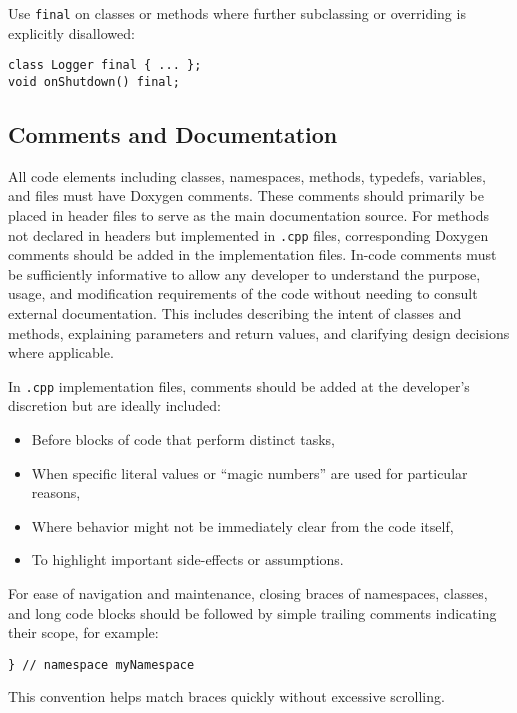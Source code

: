 Use \texttt{final} on classes or methods where further subclassing or overriding is explicitly disallowed:
\begin{lstlisting}[style=cppstyle]
class Logger final { ... };
void onShutdown() final;
\end{lstlisting}


\subsection{Comments and Documentation}

All code elements including classes, namespaces, methods, typedefs, variables, and files must have Doxygen comments. These comments should primarily be placed in header files to serve as the main documentation source. For methods not declared in headers but implemented in \texttt{.cpp} files, corresponding Doxygen comments should be added in the implementation files. In-code comments must be sufficiently informative to allow any developer to understand the purpose, usage, and modification requirements of the code without needing to consult external documentation. This includes describing the intent of classes and methods, explaining parameters and return values, and clarifying design decisions where applicable.

In \texttt{.cpp} implementation files, comments should be added at the developer’s discretion but are ideally included:
\begin{itemize}
    \item Before blocks of code that perform distinct tasks,
    \item When specific literal values or “magic numbers” are used for particular reasons,
    \item Where behavior might not be immediately clear from the code itself,
    \item To highlight important side-effects or assumptions.
\end{itemize}

For ease of navigation and maintenance, closing braces of namespaces, classes, and long code blocks should be followed by simple trailing comments indicating their scope, for example:
\begin{lstlisting}[style=cppstyle]
} // namespace myNamespace
\end{lstlisting}
This convention helps match braces quickly without excessive scrolling.


